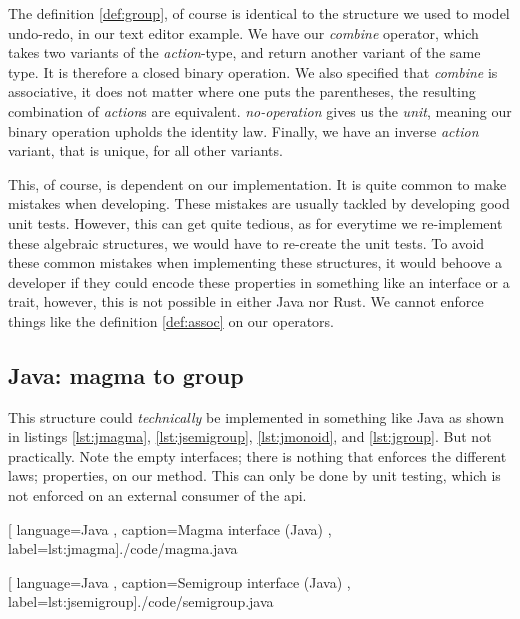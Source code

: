 The definition \ref{def:group}, of course is identical to the structure we used
to model undo-redo, in our text editor example. We have our \textit{combine}
operator, which takes two variants of the \textit{action}-type, and return
another variant of the same type. It is therefore a closed binary operation. We
also specified that \textit{combine} is associative, it does not matter where one
puts the parentheses, the resulting combination of \textit{action}s are
equivalent. \textit{no-operation} gives us the \textit{unit}, meaning our binary
operation upholds the identity law. Finally, we have an inverse \textit{action}
variant, that is unique, for all other variants.

This, of course, is dependent on our implementation. It is quite common to make
mistakes when developing. These mistakes are usually tackled by developing good
unit tests. However, this can get quite tedious, as for everytime we re-implement
these algebraic structures, we would have to re-create the unit tests. To avoid
these common mistakes when implementing these structures, it would behoove a
developer if they could encode these properties in something like an interface or
a trait, however, this is not possible in either Java nor Rust. We cannot enforce
things like the definition \ref{def:assoc} on our operators.

\subsection{Java: magma to group}

This structure could \textit{technically} be implemented in something like Java
as shown in listings \ref{lst:jmagma}, \ref{lst:jsemigroup}, \ref{lst:jmonoid},
and \ref{lst:jgroup}. But not practically. Note the empty interfaces; there is
nothing that enforces the different laws; properties, on our method. This can
only be done by unit testing, which is not enforced on an external consumer of
the \gls*{api}.

\begin{center}
  
    [ language=Java
    , caption={Magma interface (Java)}
    , label=lst:jmagma]{./code/magma.java}
\end{center}

\begin{center}
  
    [ language=Java
    , caption={Semigroup interface (Java)}
    , label=lst:jsemigroup]{./code/semigroup.java}
\end{center}

